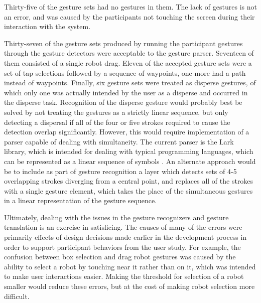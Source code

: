 Thirty-five of the gesture sets had no gestures in them. The lack of gestures is not an error, and was caused by the participants not touching the screen during their interaction with the system. 

Thirty-seven of the gesture sets produced by running the participant gestures through the gesture detectors were acceptable to the gesture parser. 
Seventeen of them consisted of a single robot drag. 
Eleven of the accepted gesture sets were a set of tap selections followed by a sequence of waypoints, one more had a path instead of waypoints. 
Finally, six gesture sets were treated as disperse gestures, of which only one was actually intended by the user as a disperse and occurred in the disperse task. 
Recognition of the disperse gesture would probably best be solved by not treating the gestures as a strictly linear sequence, but only detecting a dispersal if all of the four or five strokes required to cause the detection overlap significantly. 
However, this would require implementation of a parser capable of dealing with simultaneity. 
The current parser is the Lark library, which is intended for dealing with typical programming languages, which can be represented as a linear sequence of symbols \citep{LarkParser}. 
An alternate approach would be to include as part of gesture recognition a layer which detects sets of 4-5 overlapping strokes diverging from a central point, and replaces all of the strokes with a single gesture element, which takes the place of the simultaneous gestures in a linear representation of the gesture sequence. 

Ultimately, dealing with the issues in the gesture recognizers and gesture translation is an exercise in satisficing. 
The causes of many of the errors were primarily effects of design decisions made earlier in the development process in order to support participant behaviors from the user study. 
For example, the confusion between box selection and drag robot gestures was caused by the ability to select a robot by touching near it rather than on it, which was intended to make user interactions easier. 
Making the threshold for selection of a robot smaller would reduce these errors, but at the cost of making robot selection more difficult. 

%

